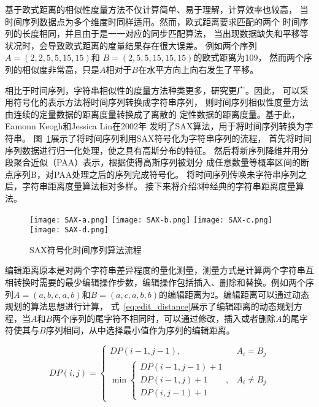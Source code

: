 基于欧式距离的相似性度量方法不仅计算简单、易于理解，计算效率也较高，
当时间序列数据点为多个维度时同样适用。然而，欧式距离要求匹配的两个
时间序列的长度相同，并且由于是一一对应的同步匹配算法，
当出现数据缺失和平移等状况时，会导致欧式距离的度量结果存在很大误差。
例如两个序列$A=\left(2,2,5,5,15,15\right)$和
$B=\left(2,5,5,15,15,15\right)$的欧式距离为109，
然而两个序列的相似度非常高，只是$A$相对于$B$在水平方向上向右发生了平移。

相比于时间序列，字符串相似性的度量方法种类更多，研究更广。因此，
可以采用符号化的表示方法将时间序列转换成字符串序列，
则时间序列相似性度量方法由连续的定量数据的距离度量转换成了离散的
定性数据的距离度量。基于此，Eamonn Keogh和Jessica Lin在2002年
发明了SAX算法，用于将时间序列转换为字符串。
图~\ref{fig:SAX}展示了将时间序列利用SAX符号化为字符串序列的流程，
首先将时间序列数据进行归一化处理，使之具有高斯分布的特征。
然后将新序列降维并用分段聚合近似（PAA）表示，根据使得高斯序列被划分
成任意数量等概率区间的断点序列B，对PAA处理之后的序列完成符号化。
将时间序列传唤未字符串序列之后，字符串距离度量算法相对多样。
接下来将介绍3种经典的字符串距离度量算法。
\begin{figure}
  \centering
    {\texttt{[image: SAX-a.png]}}
    {\texttt{[image: SAX-b.png]}}
    {\texttt{[image: SAX-c.png]}}
    {\texttt{[image: SAX-d.png]}}
  \caption{SAX符号化时间序列算法流程}
  \label{fig:SAX}
\end{figure}

编辑距离原本是对两个字符串差异程度的量化测量，测量方式是计算两个字符串互相转换时需要的最少编辑操作步数，编辑操作包括插入、删除和替换。例如两个序列$A=\left(a,b,c,a,b\right)$和$B=\left(a,c,a,b,b\right)$的编辑距离为2。编辑距离可以通过动态规划的算法思想进行计算，
式~\ref{eq:edit_distance}展示了编辑距离的动态规划方程，当$A$和$B$两个序列的尾字符不相同时，可以通过修改，插入或者删除$A$的尾字符使其与$B$序列相同，从中选择最小值作为序列的编辑距离。


\begin{equation}
  DP(i, j)= \begin{cases}DP(i-1, j-1), & A_{i}=B_{j} \\
    \min \left\{\begin{array}{c}
    D P(i-1, j-1)+1 \\
    D P(i-1, j)+1 \\
    D P(i, j-1)+1
    \end{array}\right. , & A_{i} \neq B_{j}
  \end{cases}
  \label{eq:edit_distance}
\end{equation}

